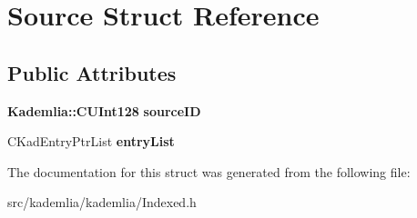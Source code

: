 \section{Source Struct Reference}
\label{structSource}
\subsection*{Public Attributes}
\begin{DoxyCompactItemize}
\item 
{\bf Kademlia::CUInt128} {\bfseries sourceID}\label{structSource_a089388f09e6d9d4a372d886090a2a87b}

\item 
CKadEntryPtrList {\bfseries entryList}\label{structSource_ae2cd50ddfe5c4bdbb6e3adb3f8190fa8}

\end{DoxyCompactItemize}


The documentation for this struct was generated from the following file:\begin{DoxyCompactItemize}
\item 
src/kademlia/kademlia/Indexed.h\end{DoxyCompactItemize}
